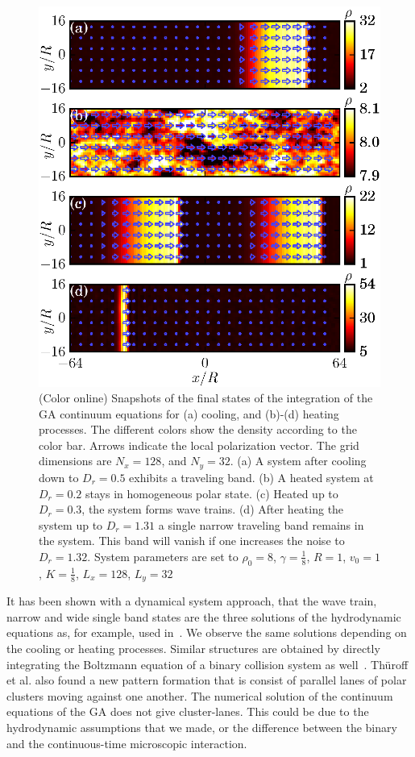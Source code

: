 \documentclass[reprint,floatfix,amsmath,amssymb,aps,pre,showkeys,showpacs,superscriptaddress]{revtex4-1}
\begin{document}
\begin{figure}
	\centering
	\includegraphics[width=\columnwidth]{Fig6_snapshots-ga}
	\caption{(Color online) Snapshots of the final states of the integration of the GA continuum equations for (a) cooling, and (b)-(d) heating processes. The different colors show the density according to the color bar. Arrows indicate the local polarization vector. The grid dimensions are $N_x=128$, and $N_y=32$. (a) A system after cooling down to $D_r=0.5$ exhibits a traveling band. (b) A heated system at $D_r=0.2$ stays in homogeneous polar state. (c) Heated up to $D_r=0.3$, the system forms wave trains. (d) After heating the system up to $D_r=1.31$ a single narrow traveling band remains in the system. This band will vanish if one increases the noise to $D_r=1.32$. System parameters are set to $\rho_0=8$, $\gamma=\tfrac{1}{8}$, $R=1$, $v_0=1$, $K=\tfrac{1}{8}$, $L_x=128$, $L_y=32$}
\label{fig:snapshots-ga}
\end{figure}

It has been shown with a dynamical system approach, that the wave train, narrow and wide single band states are the three solutions of the hydrodynamic equations as, for example, used in~\cite{caussin2014}. We observe the same solutions depending on the cooling or heating processes. Similar structures are obtained by directly integrating the Boltzmann equation of a binary collision system as well~\cite{thuroff2014numerical}. Th{\"u}roff et al. also found a new pattern formation that is consist of parallel lanes of polar clusters moving against one another. The numerical solution of the continuum equations of the GA does not give cluster-lanes. This could be due to the hydrodynamic assumptions that we made, or the difference between the binary and the continuous-time microscopic interaction.
\end{document}
